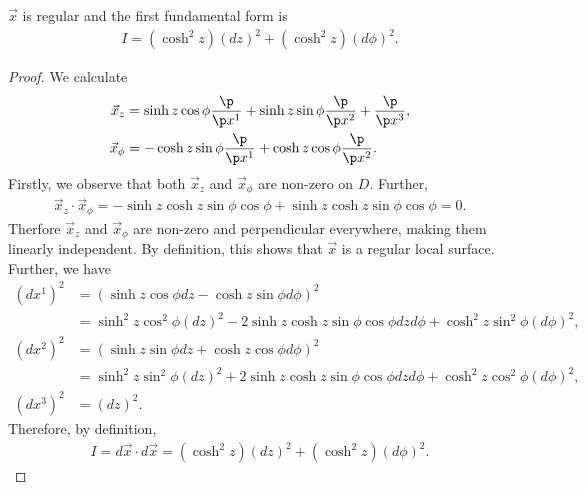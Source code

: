 \documentclass{article}
\begin{document}
\begin{claim*}
   $\vec x$ is regular and the first fundamental form is 
   \begin{align*}
      I= (\cosh^2 z)(dz)^2 + (\cosh^2 z) (d\phi)^2.
   \end{align*}
\end{claim*}
\begin{proof}
   We calculate 
   \begin{align}
      \label{dirderiv1}
      \vec x_z &= \sinh z \cos\phi \frac{\p }{\p x^1} 
      + \sinh z \sin\phi \frac{\p }{\p x^2} 
      + \frac{\p }{\p x^3},\\
      \label{dirderiv2}
      \vec x_\phi &= -\cosh z \sin\phi \frac{\p }{\p x^1} 
      + \cosh z\cos\phi\frac{\p }{\p x^2}.
   \end{align}
   Firstly, we observe that both $\vec x_z$ and $\vec x_\phi$ are non-zero on $D$.
   Further,
   \begin{align*}
      \vec x_z \cdot \vec x_\phi = -\sinh z\cosh z\sin\phi\cos\phi + \sinh z\cosh z\sin\phi\cos\phi
      = 0.
   \end{align*}
   Therfore $\vec x_z$ and $\vec x_\phi$ are non-zero and perpendicular everywhere, making them linearly 
   independent. By definition, this shows that $\vec x$ is a regular local surface.
   Further, we have 
   \begin{align*}
      (dx^1)^2 &= (\sinh z\cos\phi dz - \cosh z \sin\phi d\phi)^2\\
      &=\sinh^2 z \cos^2\phi(dz)^2
      -2\sinh z\cosh z\sin\phi\cos\phi dzd\phi+\cosh^2z\sin^2\phi(d\phi)^2,\\
      (dx^2)^2 &= (\sinh z\sin\phi dz + \cosh z \cos\phi d\phi)^2\\
      &=\sinh^2 z\sin^2\phi (dz)^2 + 2\sinh z\cosh z\sin\phi\cos\phi dzd\phi + \cosh^2 z\cos^2\phi(d\phi)^2,\\
      (dx^3)^2 &=(dz)^2.
   \end{align*}
   Therefore, by definition, 
   \begin{align*}
      I=d\vec x\cdot d\vec x = (\cosh^2 z)(dz)^2 + (\cosh^2 z) (d\phi)^2.
   \end{align*}
\end{proof}
\end{document}
